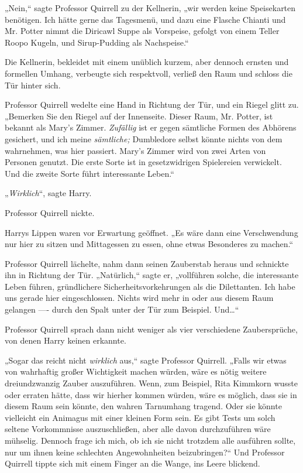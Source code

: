 {„Nein,“ sagte Professor Quirrell zu der Kellnerin, „wir werden keine Speisekarten benötigen. Ich hätte gerne das Tagesmenü, und dazu eine Flasche Chianti und Mr. Potter nimmt die Diricawl Suppe als Vorspeise, gefolgt von einem Teller Roopo Kugeln, und Sirup-Pudding als Nachspeise.“

Die Kellnerin, bekleidet mit einem unüblich kurzem, aber dennoch ernsten und formellen Umhang, verbeugte sich respektvoll, verließ den Raum und schloss die Tür hinter sich.

Professor Quirrell wedelte eine Hand in Richtung der Tür, und ein Riegel glitt zu. „Bemerken Sie den Riegel auf der Innenseite. Dieser Raum, Mr. Potter, ist bekannt als Mary's Zimmer. \emph{Zufällig} ist er gegen sämtliche Formen des Abhörens gesichert, und ich meine \emph{sämtliche;} Dumbledore selbst könnte nichts von dem wahrnehmen, was hier passiert. Mary's Zimmer wird von zwei Arten von Personen genutzt. Die erste Sorte ist in gesetzwidrigen Spielereien verwickelt. Und die zweite Sorte führt interessante Leben.“

„\emph{Wirklich}“, sagte Harry.

Professor Quirrell nickte.

Harrys Lippen waren vor Erwartung geöffnet. „Es wäre dann eine Verschwendung nur hier zu sitzen und Mittagessen zu essen, ohne etwas Besonderes zu machen.“

Professor Quirrell lächelte, nahm dann seinen Zauberstab heraus und schnickte ihn in Richtung der Tür. „Natürlich,“ sagte er, „vollführen solche, die interessante Leben führen, gründlichere Sicherheitsvorkehrungen als die Dilettanten. Ich habe uns gerade hier eingeschlossen. Nichts wird mehr in oder aus diesem Raum gelangen ---- durch den Spalt unter der Tür zum Beispiel. Und…“

Professor Quirrell sprach dann nicht weniger als vier verschiedene Zaubersprüche, von denen Harry keinen erkannte.

„Sogar das reicht nicht \emph{wirklich} aus,“ sagte Professor Quirrell. „Falls wir etwas von wahrhaftig großer Wichtigkeit machen würden, wäre es nötig weitere dreiundzwanzig Zauber auszuführen. Wenn, zum Beispiel, Rita Kimmkorn wusste oder erraten hätte, dass wir hierher kommen würden, wäre es möglich, dass sie in diesem Raum sein könnte, den wahren Tarnumhang tragend. Oder sie könnte vielleicht ein Animagus mit einer kleinen Form sein. Es gibt Tests um solch seltene Vorkommnisse auszuschließen, aber alle davon durchzuführen wäre mühselig. Dennoch frage ich mich, ob ich sie nicht trotzdem alle ausführen sollte, nur um ihnen keine schlechten Angewohnheiten beizubringen?“ Und Professor Quirrell tippte sich mit einem Finger an die Wange, ins Leere blickend.

}
